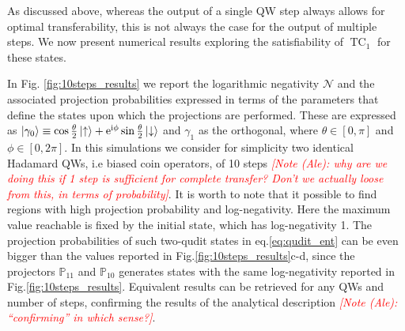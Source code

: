 \documentclass[
	aps, pra,
	superscriptaddress, twocolumn,
	floatfix,
	10pt
]{revtex4-1}
\newcommand{\on}[1]{\operatorname{#1}}
\newcommand{\parTitle}[1]{\noindent{\color{Mahogany}(\emph{#1})}}
\newcommand{\PP}{\mathbb{P}}
\newcommand{\commale}[1]{{\textcolor{red} {\it{[Note (Ale): #1]}}}}
\renewcommand{\parTitle}[1]{}
\begin{document}
\parTitle{What do we do here and why}
As discussed above, whereas the output of a single QW step always allows for optimal transferability, this is not always the case for the output of multiple steps.
We now present numerical results exploring the satisfiability of $\on{TC}_1$ for these states.
\parTitle{Case with same QW on both sides}
In Fig. \ref{fig:10steps_results} we report the logarithmic negativity $\mathcal{N}$ and the associated projection probabilities expressed in terms of the parameters that define the states upon which the projections are performed. These are expressed as $\ket{\gamma_0}\equiv\cos{\frac{\theta}{2}} \ket{\uparrow}+ 
 \mathrm{e}^{\mathrm{i}\phi}\sin{\frac{\theta}{2}}\ket{\downarrow}$ and $\gamma_1$ as the orthogonal,
where $\theta \in [0, \pi ]$ and $\phi \in [0, 2\pi]$. In this simulations we consider for simplicity two identical Hadamard QWs, i.e biased coin operators, of 10 steps \commale{why are we doing this if 1 step is sufficient for complete transfer? Don't we actually loose from this, in terms of probability}. It is worth to note that it possible to find regions with high projection probability and log-negativity. Here the maximum value reachable is fixed by the initial state, which has log-negativity 1. The projection probabilities of such two-qudit states in eq.\eqref{eq:qudit_ent} can be even bigger than the values reported in Fig.\ref{fig:10steps_results}c-d, since the projectors $\PP_{11}$ and $\PP_{10}$ generates states with the same log-negativity reported in Fig.\ref{fig:10steps_results}.
Equivalent results can be retrieved for any QWs and number of steps, confirming the results of the analytical description \commale{``confirming'' in which sense?}. 
\end{document}
